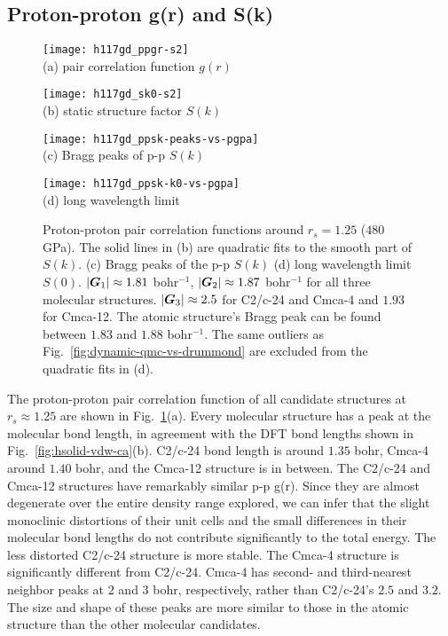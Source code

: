 \subsection{Proton-proton g(r) and S(k)}

\begin{figure}[h]
	\centering
	\begin{minipage}{0.49\textwidth}
		\centering
		\texttt{[image: h117gd\_ppgr-s2]}\\
		(a) pair correlation function $g(r)$
	\end{minipage}
	\begin{minipage}{0.49\textwidth}
		\centering
		\texttt{[image: h117gd\_sk0-s2]}\\
		(b) static structure factor $S(k)$
	\end{minipage}
	\centering
	\begin{minipage}{0.49\textwidth}
		\centering
		\texttt{[image: h117gd\_ppsk-peaks-vs-pgpa]}\\
		(c) Bragg peaks of p-p $S(k)$
	\end{minipage}
	\begin{minipage}{0.49\textwidth}
		\centering
		\texttt{[image: h117gd\_ppsk-k0-vs-pgpa]}\\
		(d) long wavelength limit
	\end{minipage}
	\caption{Proton-proton pair correlation functions around $r_s=1.25$ ($480$ GPa). The solid lines in (b) are quadratic fits to the smooth part of $S(k)$. (c) Bragg peaks of the p-p $S(k)$ (d) long wavelength limit $S(0)$.  $\vert\boldsymbol{G}_1\vert\approx 1.81$ bohr$^{-1}$, $\vert\boldsymbol{G}_2\vert\approx 1.87$ bohr$^{-1}$ for all three molecular structures. $\vert\boldsymbol{G}_3\vert\approx 2.5$ for C2/c-24 and Cmca-4 and $1.93$ for Cmca-12. The atomic structure's Bragg peak can be found between $1.83$ and $1.88$ bohr$^{-1}$. The same outliers as Fig.~\ref{fig:dynamic-qmc-vs-drummond} are excluded from the quadratic fits in (d).}
	\label{fig:hsolid-ppgrsk}
\end{figure}

The proton-proton pair correlation function of all candidate structures at $r_s\approx1.25$ are shown in Fig.~\ref{fig:hsolid-ppgrsk}(a).
Every molecular structure has a peak at the molecular bond length, in agreement with the DFT bond lengths shown in Fig.~\ref{fig:hsolid-vdw-ca}(b).
C2/c-24 bond length is around $1.35$ bohr, Cmca-4 around $1.40$ bohr, and the Cmca-12 structure is in between.
The C2/c-24 and Cmca-12 structures have remarkably similar p-p g(r).
Since they are almost degenerate over the entire density range explored, we can infer that the slight monoclinic distortions of their unit cells and the small differences in their molecular bond lengths do not contribute significantly to the total energy.
The less distorted C2/c-24 structure is more stable.
The Cmca-4 structure is significantly different from C2/c-24. Cmca-4 has second- and third-nearest neighbor peaks at $2$ and $3$ bohr, respectively, rather than C2/c-24's $2.5$ and $3.2$. The size and shape of these peaks are more similar to those in the atomic structure than the other molecular candidates.

